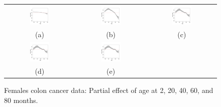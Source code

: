 \documentclass[12pt]{article}
\begin{document}
\begin{figure}[h!]
\centering
\begin{tabular}{c c c}
\includegraphics[width=0.3\textwidth]{peff1_females.pdf} & 
\includegraphics[width=0.3\textwidth]{peff10_females.pdf} & 
\includegraphics[width=0.3\textwidth]{peff20_females.pdf}\\
 (a) & (b) & (c) \\
 \includegraphics[width=0.3\textwidth]{peff30_females.pdf} & 
\includegraphics[width=0.3\textwidth]{peff40_females.pdf} & 
\\
 (d) & (e) & 
 \end{tabular}
\caption{ Females colon cancer data: Partial effect of age at 2, 20, 40, 60, and 80 months.}
\label{fig:peff_age_females}
\end{figure}
\end{document}
